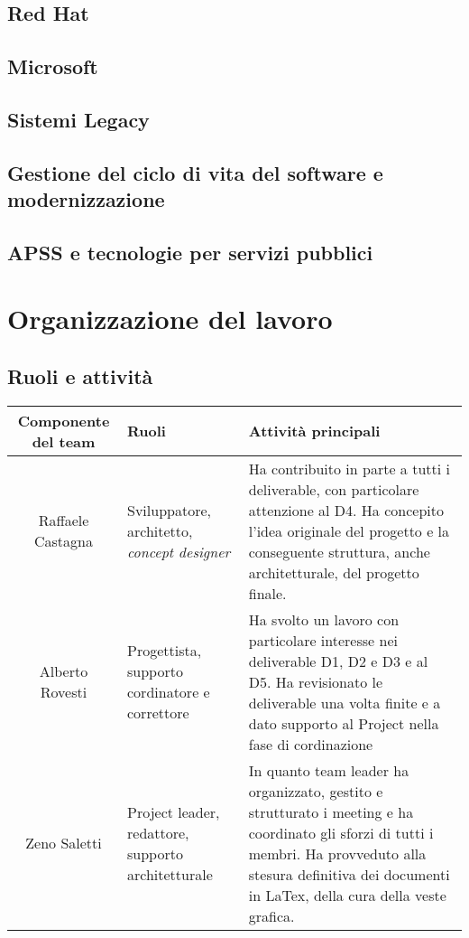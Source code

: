 \documentclass[11pt, a4paper]{article}
\theoremstyle{definition}
\begin{document}
\subsection{Red Hat}
\subsection{Microsoft}
\subsection{Sistemi Legacy}
\subsection{Gestione del ciclo di vita del software e modernizzazione}
\subsection{APSS e tecnologie per servizi pubblici}

\newpage
\section{Organizzazione del lavoro}
\subsection{Ruoli e attività}
\begin{center}
  \footnotesize
  \begin{tabularx}{\textwidth}{|c||X||X|}
      \hline
      \cellcolor{red!70}Componente del team & \cellcolor{red!70}Ruoli & \cellcolor{red!70}Attività principali\\
      \hline
      Raffaele Castagna & Sviluppatore, architetto, \textit{concept designer} & Ha contribuito in parte a tutti i deliverable, con particolare attenzione al D4. Ha concepito l'idea originale del progetto e la conseguente struttura, anche architetturale, del progetto finale.\\
      \hline
      Alberto Rovesti & Progettista, supporto cordinatore e correttore & Ha svolto un lavoro con particolare interesse nei deliverable D1, D2 e D3 e al D5. Ha revisionato le deliverable una volta finite e a dato supporto al Project nella fase di cordinazione\\
      \hline
      Zeno Saletti & Project leader, redattore, supporto architetturale & In quanto team leader ha organizzato, gestito e strutturato i meeting e ha coordinato gli sforzi di tutti i membri. Ha provveduto alla stesura definitiva dei documenti in LaTex, della cura della veste grafica.\\
      \hline
  \end{tabularx}
\end{center}
\end{document}
